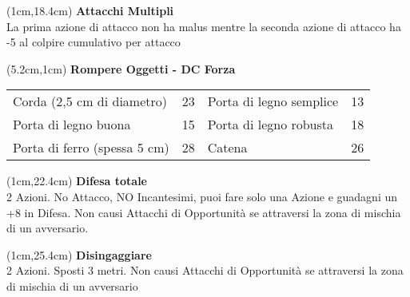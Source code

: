 \documentclass[a4paper,12 pt,openany]{book}
\begin{document}
\begin{textblock*}{4cm}(1cm,18.4cm) %
	\textbf{Attacchi Multipli}\\
	La prima azione di attacco non ha malus mentre la seconda azione di attacco ha -5 al colpire cumulativo per attacco
\end{textblock*}




\begin{textblock*}{15cm}(5.2cm,1cm) %
\textbf{Rompere Oggetti - DC Forza}\\
\begin{tabular}{ll|ll}
	Corda (2,5 cm di diametro)               & 23&	Porta di legno semplice                 & 13\\
	Porta di legno buona                    & 15&Porta di legno robusta               & 18\\
	Porta di ferro (spessa 5 cm)           & 28&	Catena                                 & 26 \\
\end{tabular}

\end{textblock*}


\begin{textblock*}{8cm}(1cm,22.4cm) %
\textbf{Difesa totale}\\
2 Azioni. No Attacco, NO Incantesimi, puoi fare solo una Azione e guadagni un +8 in Difesa. Non causi Attacchi di Opportunità se attraversi la zona di mischia di un avversario.
\end{textblock*}

\begin{textblock*}{8cm}(1cm,25.4cm) %
\textbf{Disingaggiare}\\
2 Azioni. Sposti 3 metri. Non causi Attacchi di Opportunità se attraversi la zona di mischia di un avversario
\end{textblock*}
\end{document}

